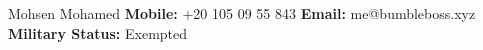 {
	\noindent
	\fontsize{27pt}{27pt}\blackColor\optifont
	Mohsen Mohamed
}
\newline
\textbf{Mobile:} +20 105 09 55 843
%
\quad\quad
\textbf{Email:} me@bumbleboss.xyz
%
\quad\quad
\textbf{Military Status:} Exempted
